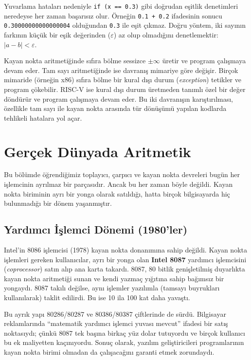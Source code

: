Yuvarlama hataları nedeniyle \texttt{if (x == 0.3)} gibi doğrudan eşitlik denetimleri neredeyse her zaman başarısız olur. Örneğin \texttt{0.1 + 0.2} ifadesinin sonucu \texttt{0.30000000000000004} olduğundan \texttt{0.3} ile eşit çıkmaz. Doğru yöntem, iki sayının farkının küçük bir eşik değerinden ($\varepsilon$) az olup olmadığını denetlemektir: $|a - b| < \varepsilon$.

Kayan nokta aritmetiğinde sıfıra bölme sessizce $\pm\infty$ üretir ve program çalışmaya devam eder. Tam sayı aritmetiğinde ise davranış mimariye göre değişir. Birçok mimaride (örneğin x86) sıfıra bölme bir kural dışı durum (\emph{exception}) tetikler ve program çökebilir. RISC-V ise kural dışı durum üretmeden tanımlı özel bir değer döndürür ve program çalışmaya devam eder. Bu iki davranışın karıştırılması, özellikle tam sayı ile kayan nokta arasında tür dönüşümü yapılan kodlarda tehlikeli hatalara yol açar.


\section{Gerçek Dünyada Aritmetik}
\label{sec:gercek-dunyada-aritmetik}

Bu bölümde öğrendiğimiz toplayıcı, çarpıcı ve kayan nokta devreleri bugün her işlemcinin ayrılmaz bir parçasıdır. Ancak bu her zaman böyle değildi. Kayan nokta biriminin ayrı bir yonga olarak satıldığı, hatta birçok bilgisayarda hiç bulunmadığı bir dönem yaşanmıştır.

\subsection{Yardımcı İşlemci Dönemi (1980'ler)}
Intel'in 8086 işlemcisi (1978) kayan nokta donanımına sahip değildi. Kayan nokta işlemleri gereken kullanıcılar, ayrı bir yonga olan \textbf{Intel 8087} yardımcı işlemcisini (\emph{coprocessor}) satın alıp ana karta takardı. 8087, 80 bitlik genişletilmiş duyarlıkta kayan nokta aritmetiği sunan ve kendi yazmaç yığıtına sahip bağımsız bir yongaydı. 8087 takılı değilse, aynı işlemler yazılımla (tamsayı buyrukları kullanılarak) taklit edilirdi. Bu ise 10 ila 100 kat daha yavaştı.

Bu ayrık yapı 80286/80287 ve 80386/80387 çiftlerinde de sürdü. Bilgisayar reklamlarında ``matematik yardımcı işlemci yuvası mevcut'' ifadesi bir satış noktasıydı; çünkü 8087 tek başına birkaç yüz dolar tutuyordu ve birçok kullanıcı bu ek maliyetten kaçınıyordu. Sonuç olarak, yazılım geliştiricileri programlarının kayan nokta birimi olmadan da çalışacağını garanti etmek zorundaydı.


